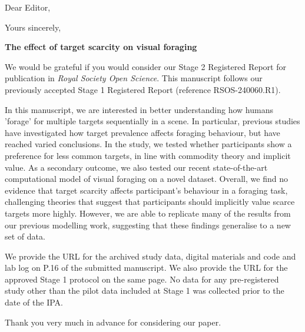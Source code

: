 \documentclass[11pt,a4paper,roman]{moderncv}        %
\begin{document}
\recipient{}{}
\date{\today}
\opening{Dear Editor,}
\closing{Yours sincerely,}
\makelettertitle

\textbf{The effect of target scarcity on visual foraging}

We would be grateful if you would consider our Stage 2 Registered Report for publication in \textit{Royal Society Open Science}. This manuscript follows our previously accepted Stage 1 Registered Report (reference RSOS-240060.R1). 

In this manuscript, we are interested in better understanding how humans 'forage' for multiple targets sequentially in a scene. In particular, previous studies have investigated how target prevalence affects foraging behaviour, but have reached varied conclusions. In the study, we tested whether participants show a preference for less common targets, in line with commodity theory and implicit value. As a secondary outcome, we also tested our recent state-of-the-art computational model of visual foraging on a novel dataset. Overall, we find no evidence that target scarcity affects participant's behaviour in a foraging task, challenging theories that suggest that participants should implicitly value scarce targets more highly. However, we are able to replicate many of the results from our previous modelling work, suggesting that these findings generalise to a new set of data.

We provide the URL for the archived study data, digital materials and code and lab log on P.16 of the submitted manuscript. We also provide the URL for the approved Stage 1 protocol on the same page. No data for any pre-registered study other than the pilot data included at Stage 1 was collected prior to the date of the IPA.

Thank you very much in advance for considering our paper.

\vspace{0.5cm}


\makeletterclosing
\end{document}
